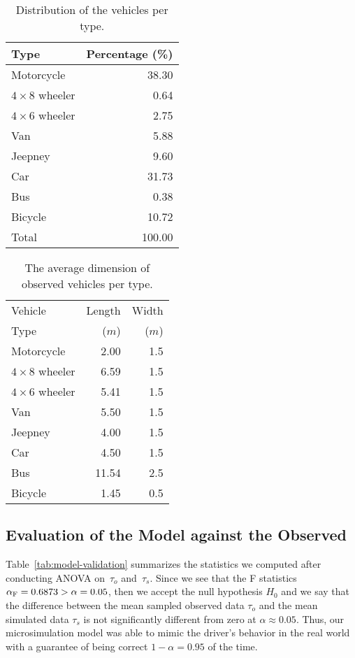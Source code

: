 \documentclass[preprint]{./acm_proc_article-sp}
\begin{document}
\begin{table}[bth]
\caption{Distribution of the vehicles per type.}\label{tab:vehicle-type}
\centering\begin{tabular}{lr}
\hline\hline
Type &  Percentage (\%) \\
\hline
Motorcycle           &  38.30\\
$4\times 8$ wheeler  &   0.64\\
$4\times 6$ wheeler  &   2.75\\
Van                  &   5.88\\
Jeepney              &   9.60\\
Car                  &  31.73\\
Bus                  &   0.38\\
Bicycle              &  10.72\\
\hline
Total                & 100.00\\
\hline\hline
\end{tabular}
\end{table}

\begin{table}[bth]
\caption{The average dimension of observed vehicles per type.}\label{tab:vehicle-dimension}
\centering\begin{tabular}{lrr}
\hline\hline
Vehicle & Length & Width \\
Type    & ($m$)    & ($m$)  \\
\hline
Motorcycle           &  2.00 & 1.5\\
$4\times 8$ wheeler  &  6.59 & 1.5\\
$4\times 6$ wheeler  &  5.41 & 1.5\\
Van                  &  5.50 & 1.5\\
Jeepney              &  4.00 & 1.5\\
Car                  &  4.50 & 1.5\\
Bus                  & 11.54 & 2.5\\
Bicycle              &  1.45 & 0.5\\
\hline\hline
\end{tabular}
\end{table}


\subsection{Evaluation of the Model against the Observed}

Table~\ref{tab:model-validation} summarizes the statistics we computed after conducting ANOVA on~$\tau_o$ and~$\tau_s$. Since we see that the F statistics $\alpha_{\rm F}=0.6873 > \alpha = 0.05$, then we accept the null hypothesis $H_0$ and we say that the difference between the mean sampled observed data $\tau_o$ and the mean simulated data $\tau_s$ is not significantly different from zero at $\alpha \approx 0.05$. Thus, our microsimulation model was able to mimic the driver's behavior in the real world with a guarantee of being correct $1 - \alpha = 0.95$ of the time.
\end{document}
